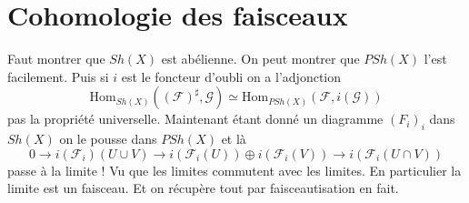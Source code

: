 \documentclass[a4paper,12pt]{book}
\newcommand{\F}{\mathscr F}
\newcommand{\Hom}{\textrm{Hom}}
\newcommand{\G}{\mathscr{G}}
\theoremstyle{plain}
\theoremstyle{definition}
\theoremstyle{remark}
\begin{document}
\chapter{Cohomologie des faisceaux}
Faut montrer que $Sh(X)$ est abélienne. On peut montrer que
$PSh(X)$ l'est facilement. Puis si $i$ est le foncteur d'oubli
on a l'adjonction
\[\Hom_{Sh(X)}((\F)^\sharp,\G)\simeq \Hom_{PSh(X)}(\F,i(\G))\]
pas la propriété universelle. Maintenant étant donné un 
diagramme $(F_i)_i$ dans $Sh(X)$ on le pousse dans $PSh(X)$ et
là 
\[0\to i(\F_i)(U\cup V)\to i(\F_i(U))\oplus i(\F_i(V))\to i(\F_i(U\cap V))\]
passe à la limite ! Vu que les limites commutent avec les
limites. En particulier la limite est un faisceau. Et on récupère
tout par faisceautisation en fait.

\end{document}
